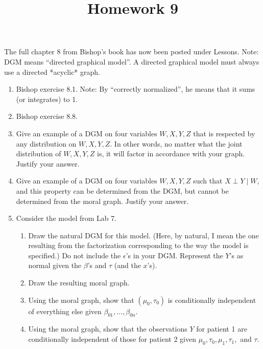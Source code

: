 \documentclass[12pt]{article}
\title{Homework 9}
\author{}
\date{}
\begin{document}
\maketitle

The full chapter 8 from Bishop's book has now been posted under Lessons.
Note: DGM means ``directed graphical model''.
A directed graphical model must always use a directed *acyclic* graph.

\begin{enumerate}
    \item Bishop exercise 8.1. Note: By ``correctly normalized'', he means that it sums (or integrates) to 1.
    \item Bishop exercise 8.8.
    \item Give an example of a DGM on four variables $W,X,Y,Z$ that is respected by any distribution on $W,X,Y,Z$. In other words, no matter what the joint distribution of $W,X,Y,Z$ is, it will factor in accordance with your graph. Justify your answer.
    \item Give an example of a DGM on four variables $W,X,Y,Z$ such that $X\perp Y\mid W$, and this property can be determined from the DGM, but cannot be determined from the moral graph. Justify your answer.
    \item Consider the model from Lab 7.
    \begin{enumerate}
        \item Draw the natural DGM for this model. (Here, by natural, I mean the one resulting from the factorization corresponding to the way the model is specified.) Do not include the $\epsilon$'s in your DGM. Represent the $Y$'s as normal given the $\beta$'s and $\tau$ (and the $x$'s).
        \item Draw the resulting moral graph.
        \item Using the moral graph, show that $(\mu_0,\tau_0)$ is conditionally independent of everything else given $\beta_{01},\ldots,\beta_{0n}$.
        \item Using the moral graph, show that the observations $Y$ for patient 1 are conditionally independent of those for patient 2 given $\mu_0,\tau_0,\mu_1,\tau_1,$ and $\tau$.
    \end{enumerate}
\end{enumerate}
\end{document}
